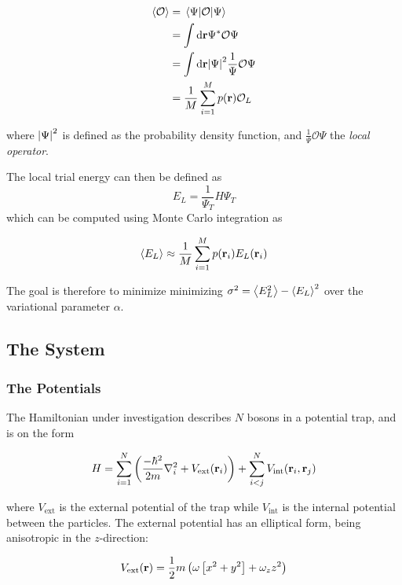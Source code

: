 \begin{align*}
  \expval{\mathcal{O}} &= \ev{\mathcal{O}}{\Psi}\\
                       &= \int \dd \vb{r} \Psi^{*}\mathcal{O}\Psi \\
                       &= \int \dd \vb{r} \abs{\Psi}^{2} \frac{1}{\Psi}\mathcal{O}\Psi\\
  &= \frac{1}{M} \sum_{i=1}^{M}p(\vb{r})\mathcal{O}_{L}
\end{align*}

where \(\abs{\Psi}^{2}\) is defined as the probability density function, and
\(\frac{1}{\Psi}\mathcal{O}\Psi\) the \textit{local operator}.

The local trial energy can then be defined as
\begin{equation*}
  E_{L} =\frac{1}{\Psi_{T}}H\Psi_{T}
\end{equation*}
which can be computed using Monte Carlo integration as

\begin{align*}
  \expval{E_{L}} \approx \frac{1}{M}\sum_{i=1}^{M} p(\vb{r}_{i})E_{L}(\vb{r}_{i})
\end{align*}

The goal is therefore to minimize minimizing \(\sigma^{2} = \expval{E_{L}^{2}} -
\expval{E_{L}}^{2}\) over the variational parameter \(\alpha\).

\subsection{The System}
\subsubsection{The Potentials}

The Hamiltonian under investigation describes \(N\) bosons in a potential trap,
and is on the form

\begin{equation*}
  H = \sum_{i=1}^{N}\left( \frac{-\hbar^{2}}{2m}\nabla^{2}_{i} + V_{\text{ext}}(\vb{r}_{i})\right) + \sum_{i<j}^{N}V_{\text{int}}(\vb{r}_{i}, \vb{r}_{j})
\end{equation*}

where \(V_{\text{ext}}\) is the external potential of the trap while
\(V_{\text{int}}\) is the internal potential between the particles. 
The external potential has an elliptical form, being anisotropic in the \(z\)-direction:

\begin{equation}
  \label{eq:2}
  V_{\text{ext}}(\vb{r}) = \frac{1}{2}m\left( \omega\left[ x^{2} + y^{2} \right] + \omega_{z}z^{2} \right)
\end{equation}

